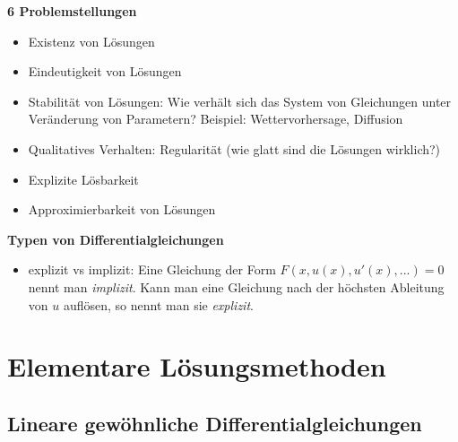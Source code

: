 \documentclass[a4paper]{book}
\theoremstyle{plain}
\theoremstyle{definition}
\newcommand{\vbreak}{\vspace{8mm}}
\begin{document}
\vbreak

\textbf{6 Problemstellungen}
\begin{itemize}
	\item Existenz von Lösungen
	\item Eindeutigkeit von Lösungen
	\item Stabilität von Lösungen: Wie verhält sich das System von Gleichungen unter Veränderung von Parametern? Beispiel: Wettervorhersage, Diffusion
	\item Qualitatives Verhalten: Regularität (wie glatt sind die Lösungen wirklich?)
	\item Explizite Lösbarkeit
	\item Approximierbarkeit von Lösungen
\end{itemize}

\vbreak 

\textbf{Typen von Differentialgleichungen}
\begin{itemize}
	\item explizit vs implizit: Eine Gleichung der Form $F(x,u(x),u'(x),...) = 0$ nennt man \emph{implizit}. Kann man eine Gleichung nach der höchsten Ableitung von $u$ auflösen, so nennt man sie \emph{explizit}.
\end{itemize}



\chapter[Elementare Lösungsmethoden]{Elementare Lösungsmethoden}
\section{Lineare gewöhnliche Differentialgleichungen}
\end{document}
